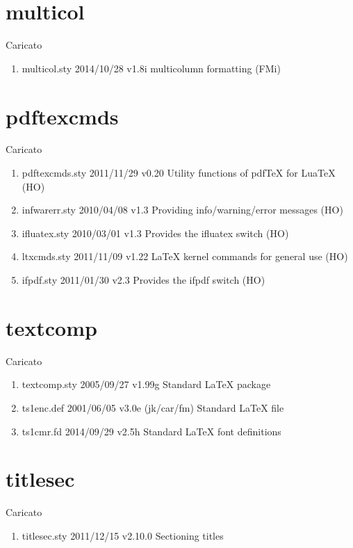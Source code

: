 \section{multicol}	 	 

Caricato 
\begin{enumerate}
\item multicol.sty 2014/10/28 v1.8i multicolumn formatting (FMi)
\end{enumerate}	
\section{pdftexcmds}	 	 

Caricato 
\begin{enumerate}
\item pdftexcmds.sty 2011/11/29 v0.20 Utility functions of pdfTeX for LuaTeX (HO)
\item infwarerr.sty 2010/04/08 v1.3 Providing info/warning/error messages (HO)
\item ifluatex.sty 2010/03/01 v1.3 Provides the ifluatex switch (HO)
\item ltxcmds.sty 2011/11/09 v1.22 LaTeX kernel commands for general use (HO)
\item ifpdf.sty 2011/01/30 v2.3 Provides the ifpdf switch (HO)
\end{enumerate}		
\section{textcomp}	 	 

Caricato 
\begin{enumerate}
\item 	textcomp.sty 2005/09/27 v1.99g Standard LaTeX package
\item 	ts1enc.def 2001/06/05 v3.0e (jk/car/fm) Standard LaTeX file
\item 	ts1cmr.fd 2014/09/29 v2.5h Standard LaTeX font definitions
\end{enumerate}	 
\section{titlesec}	 	 

Caricato 
\begin{enumerate}
	\item titlesec.sty 2011/12/15 v2.10.0 Sectioning titles
\end{enumerate}	 
